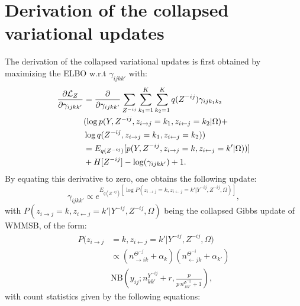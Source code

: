 
\section{Derivation of the collapsed variational updates}
\label{app:collap}

The derivation of the collapsed variational updates is first obtained by maximizing the ELBO w.r.t $\gamma_{ijkk'}$ with:
%
\begin{align*}
\frac{\partial \mathcal{L}_Z}{\partial \gamma_{ijkk'}} &= \frac{\partial }{\partial \gamma_{ijkk'}} \sum_{Z^{-ij}}\sum_{k_1=1}^K\sum_{k_2=1}^K  q(Z^{-ij}) \gamma_{ijk_1 k_2} \\
& (\log p(Y, Z^{-ij}, z_{i\rightarrow j}=k_1, z_{i\leftarrow j}=k_2|\Omega)+ \\
& \log q(Z^{-ij}, z_{i\rightarrow j}=k_1, z_{i\leftarrow j}=k_2) )   \\
& = E_{q(Z^{-ij})}[ p(Y, Z^{-ij}, z_{i\rightarrow j}=k, z_{i\leftarrow j}=k'|\Omega))] \\
& + H[Z^{-ij}] -\log(\gamma_{ijkk'}) +1.
\end{align*}
%
By equating this derivative to zero, one obtains the following update:
\begin{equation} \label{eq1}
\gamma_{ijkk'} \propto e^{E_{q(Z^{-ij})} [\log P(z_{i\rightarrow j}=k, z_{i\leftarrow j}=k' | Y^{-ij}, Z^{-ij}, \Omega)]},
\end{equation}
%
with  $P(z_{i\rightarrow j}=k, z_{i\leftarrow j}=k' | Y^{-ij}, Z^{-ij}, \Omega)$ being the collapsed Gibbs update of WMMSB, of the form:
%
\begin{align*}
P(z_{i\rightarrow j} & = k, z_{i\leftarrow j}=k' |Y^{-ij}, Z^{-ij}, \Omega) \\
& \propto (n_{\rightarrow ik}^{\Theta^{-j}} + \alpha_k) (n_{\leftarrow jk}^{\Theta^{-i}} + \alpha_{k'}) \\
& \mathrm{NB}\left(y_{ij}; n^{Y^{-ij}}_{kk'} + r, \frac{p}{p\,n^{\Phi^{-ij}}_{\bm{.}kk'} + 1} \right),
\end{align*}
%
with count statistics given by the following equations:


